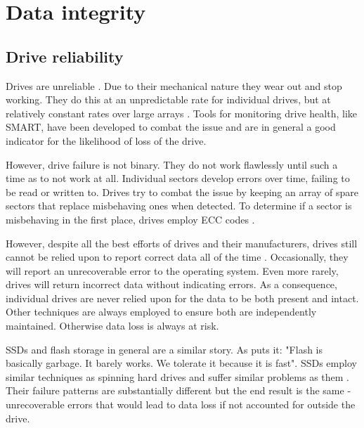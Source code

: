     \section{Data integrity}

        \subsection{Drive reliability}
            \label{sec:reliability}

            Drives are unreliable \cite{RAID, Backblaze_stats}. Due to
            their mechanical nature they wear out and stop working. They do
            this at an unpredictable rate for individual drives, but at
            relatively constant rates over large arrays \cite{Backblaze_stats}.
            Tools for monitoring drive health, like SMART, have been developed
            to combat the issue and are in general a good indicator for the
            likelihood of loss of the drive.

            However, drive failure is not binary. They do not work flawlessly
            until such a time as to not work at all. Individual sectors develop
            errors over time, failing to be read or written to.  Drives try to
            combat the issue by keeping an array of spare sectors that replace
            misbehaving ones when detected. To determine if a sector is
            misbehaving in the first place, drives employ ECC codes
            \cite{data_corruption_storage_stack}.

            However, despite all the best efforts of drives and their
            manufacturers, drives still cannot be relied upon to report correct
            data all of the time \cite{data_corruption_storage_stack}.
            Occasionally, they will report an unrecoverable error to the
            operating system. Even more rarely, drives will return incorrect
            data without indicating errors. As a consequence, individual drives
            are never relied upon for the data to be both present and intact.
            Other techniques are always employed to ensure both are
            independently maintained. Otherwise data loss is always at risk.

            SSDs and flash storage in general are a similar story. As
             puts it: "Flash is basically garbage. It
            barely works. We tolerate it because it is fast". SSDs employ
            similar techniques as spinning hard drives and suffer similar
            problems as them \cite{flash_large_scale, flash_reliability}. Their
            failure patterns are substantially different but the end result is
            the same - unrecoverable errors that would lead to data loss if not
            accounted for outside the drive.

